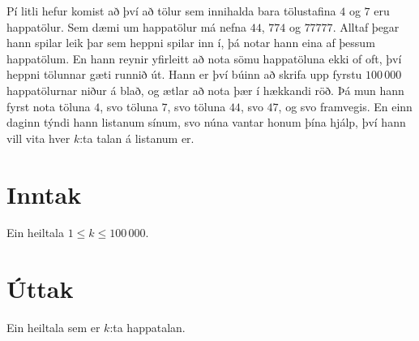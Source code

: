 

Pí litli hefur komist að því að tölur sem innihalda bara tölustafina $4$ og $7$
eru happatölur. Sem dæmi um happatölur má nefna $44$, $774$ og $77777$. Alltaf
þegar hann spilar leik þar sem heppni spilar inn í, þá notar hann eina af
þessum happatölum. En hann reynir yfirleitt að nota sömu happatöluna ekki of
oft, því heppni tölunnar gæti runnið út. Hann er því búinn að skrifa upp fyrstu
$100\,000$ happatölurnar niður á blað, og ætlar að nota þær í hækkandi röð. Þá
mun hann fyrst nota töluna $4$, svo töluna $7$, svo töluna $44$, svo $47$, og
svo framvegis. En einn daginn týndi hann listanum sínum, svo núna vantar honum
þína hjálp, því hann vill vita hver $k$:ta talan á listanum er.

\section*{Inntak}
Ein heiltala $1 \leq k \leq 100\,000$.

\section*{Úttak}
Ein heiltala sem er $k$:ta happatalan.

